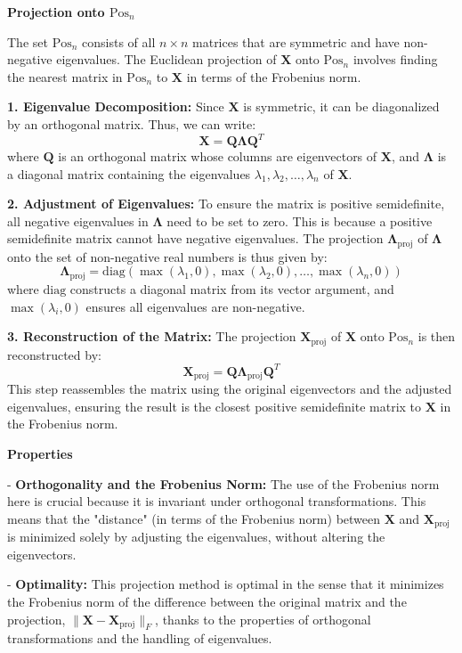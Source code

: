 \documentclass[8pt]{article}
\begin{document}
\textbf{Projection onto \(\mathrm{Pos}_n\)}

The set \(\mathrm{Pos}_n\) consists of all \(n \times n\) matrices that are symmetric and have non-negative eigenvalues. The Euclidean projection of \(\mathbf{X}\) onto \(\mathrm{Pos}_n\) involves finding the nearest matrix in \(\mathrm{Pos}_n\) to \(\mathbf{X}\) in terms of the Frobenius norm.

\textbf{1. Eigenvalue Decomposition:}
   Since \(\mathbf{X}\) is symmetric, it can be diagonalized by an orthogonal matrix. Thus, we can write:
   \[
   \mathbf{X} = \mathbf{Q} \mathbf{\Lambda} \mathbf{Q}^T
   \]
   where \(\mathbf{Q}\) is an orthogonal matrix whose columns are eigenvectors of \(\mathbf{X}\), and \(\mathbf{\Lambda}\) is a diagonal matrix containing the eigenvalues \(\lambda_1, \lambda_2, \dots, \lambda_n\) of \(\mathbf{X}\).

\textbf{2. Adjustment of Eigenvalues:}
   To ensure the matrix is positive semidefinite, all negative eigenvalues in \(\mathbf{\Lambda}\) need to be set to zero. This is because a positive semidefinite matrix cannot have negative eigenvalues. The projection \(\mathbf{\Lambda}_{\text{proj}}\) of \(\mathbf{\Lambda}\) onto the set of non-negative real numbers is thus given by:
   \[
   \mathbf{\Lambda}_{\text{proj}} = \mathrm{diag}(\max(\lambda_1, 0), \max(\lambda_2, 0), \dots, \max(\lambda_n, 0))
   \]
   where \(\mathrm{diag}\) constructs a diagonal matrix from its vector argument, and \(\max(\lambda_i, 0)\) ensures all eigenvalues are non-negative.

\textbf{3. Reconstruction of the Matrix:}
   The projection \(\mathbf{X}_{\text{proj}}\) of \(\mathbf{X}\) onto \(\mathrm{Pos}_n\) is then reconstructed by:
   \[
   \mathbf{X}_{\text{proj}} = \mathbf{Q} \mathbf{\Lambda}_{\text{proj}} \mathbf{Q}^T
   \]
   This step reassembles the matrix using the original eigenvectors and the adjusted eigenvalues, ensuring the result is the closest positive semidefinite matrix to \(\mathbf{X}\) in the Frobenius norm.

\textbf{Properties}

- \textbf{Orthogonality and the Frobenius Norm:}
   The use of the Frobenius norm here is crucial because it is invariant under orthogonal transformations. This means that the "distance" (in terms of the Frobenius norm) between \(\mathbf{X}\) and \(\mathbf{X}_{\text{proj}}\) is minimized solely by adjusting the eigenvalues, without altering the eigenvectors.
  
- \textbf{Optimality:}
   This projection method is optimal in the sense that it minimizes the Frobenius norm of the difference between the original matrix and the projection, \(\|\mathbf{X} - \mathbf{X}_{\text{proj}}\|_F\), thanks to the properties of orthogonal transformations and the handling of eigenvalues.
\end{document}
